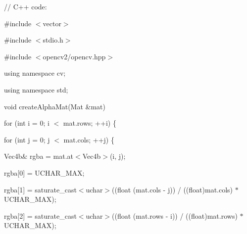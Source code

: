 {\ttfamily }

{\ttfamily }

{\ttfamily // C++ code\+:}

{\ttfamily }

{\ttfamily }

{\ttfamily \#include $<$vector$>$}

{\ttfamily }

{\ttfamily }

{\ttfamily \#include $<$stdio.\+h$>$}

{\ttfamily }

{\ttfamily }

{\ttfamily \#include $<$opencv2/opencv.\+hpp$>$}

{\ttfamily }

{\ttfamily }

{\ttfamily using namespace cv;}

{\ttfamily }

{\ttfamily }

{\ttfamily using namespace std;}

{\ttfamily }

{\ttfamily }

{\ttfamily void create\+Alpha\+Mat(\+Mat \&mat)}

{\ttfamily }

{\ttfamily }

{\ttfamily for (int i = 0; i $<$ mat.\+rows; ++i) \{}

{\ttfamily }

{\ttfamily }

{\ttfamily for (int j = 0; j $<$ mat.\+cols; ++j) \{}

{\ttfamily }

{\ttfamily }

{\ttfamily Vec4b\& rgba = mat.\+at$<$\+Vec4b$>$(i, j);}

{\ttfamily }

{\ttfamily }

{\ttfamily rgba\mbox{[}0\mbox{]} = U\+C\+H\+A\+R\+\_\+\+M\+AX;}

{\ttfamily }

{\ttfamily }

{\ttfamily rgba\mbox{[}1\mbox{]} = saturate\+\_\+cast$<$uchar$>$((float (mat.\+cols -\/ j)) / ((float)mat.\+cols) $\ast$ U\+C\+H\+A\+R\+\_\+\+M\+AX);}

{\ttfamily }

{\ttfamily }

{\ttfamily rgba\mbox{[}2\mbox{]} = saturate\+\_\+cast$<$uchar$>$((float (mat.\+rows -\/ i)) / ((float)mat.\+rows) $\ast$ U\+C\+H\+A\+R\+\_\+\+M\+AX);}

